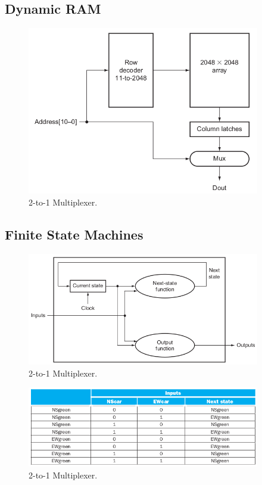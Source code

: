 \documentclass[a4paper, 11pt,oneside]{article}
\begin{document}
\subsection{Dynamic RAM}

\begin{figure}[H]
	\begin{center}
	\includegraphics[width=4in]{dram0.png}
	\caption{2-to-1 Multiplexer.}
	\label{fig:mux} 
	\end{center}
\end{figure}


\subsection{Finite State Machines}

\begin{figure}[H]
	\begin{center}
	\includegraphics[width=4in]{fsm0.png}
	\caption{2-to-1 Multiplexer.}
	\label{fig:mux} 
	\end{center}
\end{figure}

\begin{figure}[H]
	\begin{center}
	\includegraphics[width=4in]{fsm1.png}
	\caption{2-to-1 Multiplexer.}
	\label{fig:mux} 
	\end{center}
\end{figure}
\end{document}
